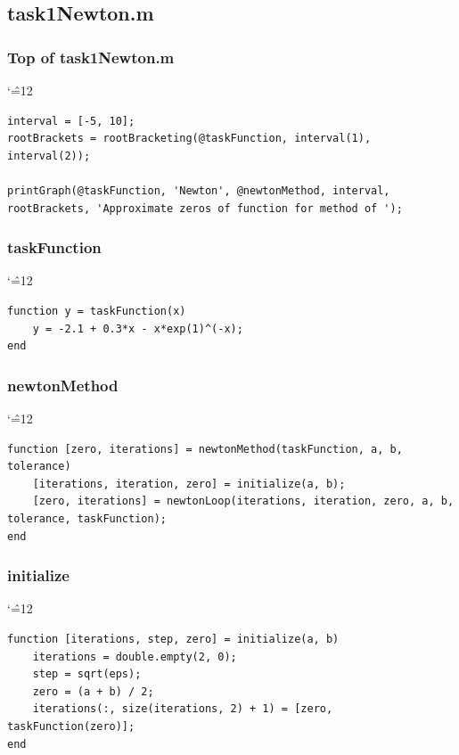 \documentclass[12pt]{report}
\newenvironment{simplechar}{%
   \catcode`\^=12
}{}
\begin{document}
\subsection{task1Newton.m}

\subsubsection{Top of task1Newton.m}
\begin{simplechar}
\begin{lstlisting}
interval = [-5, 10];
rootBrackets = rootBracketing(@taskFunction, interval(1), interval(2));

printGraph(@taskFunction, 'Newton', @newtonMethod, interval, rootBrackets, 'Approximate zeros of function for method of ');
\end{lstlisting}
\end{simplechar}

\subsubsection{taskFunction}
\begin{simplechar}
\begin{lstlisting}
function y = taskFunction(x)
    y = -2.1 + 0.3*x - x*exp(1)^(-x);
end
\end{lstlisting}
\end{simplechar}

\subsubsection{newtonMethod}
\begin{simplechar}
\begin{lstlisting}
function [zero, iterations] = newtonMethod(taskFunction, a, b, tolerance)
    [iterations, iteration, zero] = initialize(a, b);
    [zero, iterations] = newtonLoop(iterations, iteration, zero, a, b, tolerance, taskFunction);
end
\end{lstlisting}
\end{simplechar}

\subsubsection{initialize}
\begin{simplechar}
\begin{lstlisting}
function [iterations, step, zero] = initialize(a, b)
    iterations = double.empty(2, 0);
    step = sqrt(eps);
    zero = (a + b) / 2;
    iterations(:, size(iterations, 2) + 1) = [zero, taskFunction(zero)];
end
\end{lstlisting}
\end{simplechar}
\end{document}
